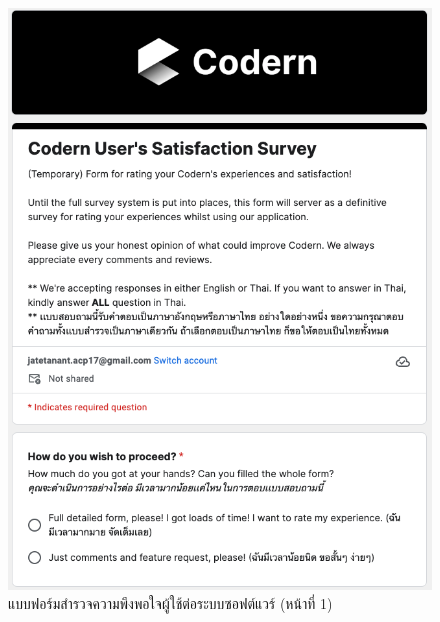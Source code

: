 \documentclass[12pt,one side,openright,a4paper]{cpe-thesis-th}
\begin{document}
\begin{figure}[H]
    \centering
    \includegraphics[width=15cm]{figure/results/forms/survey-google-p1.png}
    \caption[แบบฟอร์มสำรวจความพึงพอใจผู้ใช้ต่อระบบซอฟต์แวร์ (หน้าที่ 1)]{แบบฟอร์มสำรวจความพึงพอใจผู้ใช้ต่อระบบซอฟต์แวร์ (หน้าที่ 1)}
\end{figure}
\end{document}
